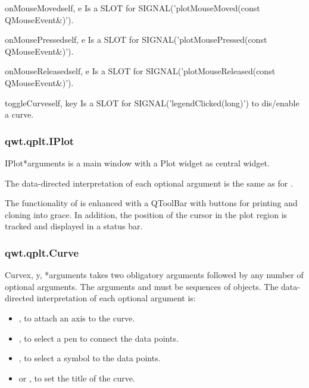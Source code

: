 \documentclass{manual}
\begin{document}
\begin{methoddesc}[Plot]{onMouseMoved}{self, e}
Is a SLOT for SIGNAL('plotMouseMoved(const QMouseEvent\&)').
\end{methoddesc}

\begin{methoddesc}[Plot]{onMousePressed}{self, e}
Is a SLOT for SIGNAL('plotMousePressed(const QMouseEvent\&)'). 
\end{methoddesc}

\begin{methoddesc}[Plot]{onMouseReleased}{self, e}
Is a SLOT for SIGNAL('plotMouseReleased(const QMouseEvent\&)').
\end{methoddesc}

\begin{methoddesc}[Plot]{toggleCurve}{self, key}
Is a SLOT for SIGNAL('legendClicked(long)') to dis/enable a curve.
\end{methoddesc}

\subsubsection{qwt.qplt.IPlot \label{intro-qplt-iplot}}

\begin{classdesc}{IPlot}{*arguments}
   is a main window with a Plot widget as central widget.

  The data-directed interpretation of each optional argument is the
  same as for .

  The functionality of  is enhanced with a QToolBar with
  buttons for printing and cloning into grace.
  In addition, the position of the cursor in the plot region is tracked
  and displayed in a status bar. 
\end{classdesc}

\subsubsection{qwt.qplt.Curve \label{intro-qplt-curve}}

\begin{classdesc}{Curve}{x, y, *arguments}
   takes two obligatory arguments followed by any number of
  optional arguments. The arguments  and  must be sequences
  of  objects.
  The data-directed interpretation of each optional argument is:
  \begin{itemize}
  \item
    , to attach an axis to the curve.
  \item
    , to select a pen to connect the data points.
  \item
    , to select a symbol to the data points.
  \item
     or , to set the title of the curve.
  \end{itemize}
\end{classdesc}
\end{document}

